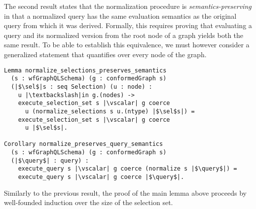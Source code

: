 The second result states that the normalization procedure is {\em
  semantics-preserving} in that a normalized query has the same
evaluation semantics as the original query from which it was
derived. Formally, this requires proving that evaluating a query and
its normalized version from the root node of a graph yields both the
same result. To be able to establish this equivalence, we must however
consider a generalized statement that quantifies over every node of the
graph.

\begin{verbatim}
Lemma normalize_selections_preserves_semantics
  (s : wfGraphQLSchema) (g : conformedGraph s) 
  (|$\sel$|s : seq Selection) (u : node) :
    u |\textbackslash|in g.(nodes) ->
    execute_selection_set s |\vscalar| g coerce
      u (normalize_selections s u.(ntype) |$\sel$s|) =
    execute_selection_set s |\vscalar| g coerce
      u |$\sel$s|.

Corollary normalize_preserves_query_semantics 
  (s : wfGraphQLSchema) (g : conformedGraph s)
  (|$\query$| : query) :
    execute_query s |\vscalar| g coerce (normalize s |$\query$|) =
    execute_query s |\vscalar| g coerce |$\query$|.
\end{verbatim}

\noindent Similarly to the previous result, the proof of the main lemma above
proceeds by well-founded induction over the size of the selection
set.


